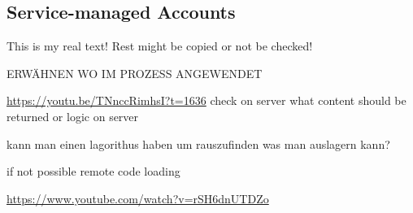 \subsection{Service-managed Accounts} \label{subsection:counter-external-service}
This is my real text! Rest might be copied or not be checked!

ERWÄHNEN WO IM PROZESS ANGEWENDET\newline


\url{https://youtu.be/TNnccRimhsI?t=1636}\newline
check on server what content should be returned or logic on server\newline

kann man einen lagorithus haben um rauszufinden was man auslagern kann?\newline

if not possible remote code loading\newline

\url{https://www.youtube.com/watch?v=rSH6dnUTDZo}
